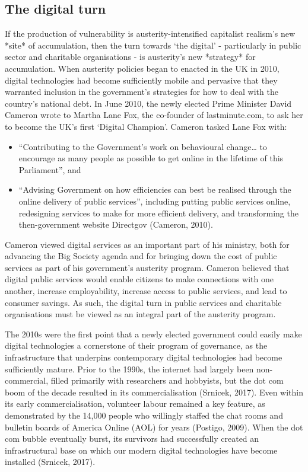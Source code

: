 \subsection{The digital turn}
\label{the-digital-turn}

If the production of vulnerability is austerity-intensified capitalist
realism's new *site* of accumulation, then the turn towards `the
digital' - particularly in public sector and charitable organisations -
is austerity's new *strategy* for accumulation. When austerity policies
began to enacted in the UK in 2010, digital technologies had become
sufficiently mobile and pervasive that they warranted inclusion in the
government's strategies for how to deal with the country's national
debt. In June 2010, the newly elected Prime Minister David Cameron wrote
to Martha Lane Fox, the co-founder of lastminute.com, to ask her to
become the UK's first `Digital Champion'. Cameron tasked Lane Fox with:

\begin{itemize}
\item
  ``Contributing to the Government's work on behavioural change\ldots{}
  to encourage as many people as possible to get online in the lifetime
  of this Parliament'', and
\end{itemize}

\begin{itemize}
\item
  ``Advising Government on how efficiencies can best be realised through
  the online delivery of public services'', including putting public
  services online, redesigning services to make for more efficient
  delivery, and transforming the then-government website Directgov
  (Cameron, 2010).
\end{itemize}

Cameron viewed digital services as an important part of his ministry,
both for advancing the Big Society agenda and for bringing down the cost
of public services as part of his government's austerity program.
Cameron believed that digital public services would enable citizens to
make connections with one another, increase employability, increase
access to public services, and lead to consumer savings. As such, the
digital turn in public services and charitable organisations must be
viewed as an integral part of the austerity program.

The 2010s were the first point that a newly elected government could
easily make digital technologies a cornerstone of their program of
governance, as the infrastructure that underpins contemporary digital
technologies had become sufficiently mature. Prior to the 1990s, the
internet had largely been non-commercial, filled primarily with
researchers and hobbyists, but the dot com boom of the decade resulted
in its commercialisation (Srnicek, 2017). Even within its early
commercialisation, volunteer labour remained a key feature, as
demonstrated by the 14,000 people who willingly staffed the chat rooms
and bulletin boards of America Online (AOL) for years (Postigo, 2009).
When the dot com bubble eventually burst, its survivors had successfully
created an infrastructural base on which our modern digital technologies
have become installed (Srnicek, 2017).


